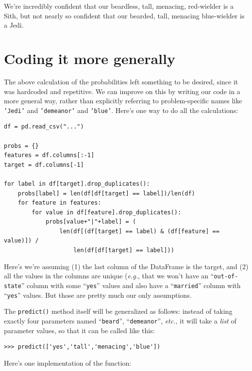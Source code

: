We're incredibly confident that our beardless, tall, menacing, red-wielder is
a Sith, but not nearly so confident that our bearded, tall, menacing
blue-wielder is a Jedi.

\vspace{.2in}
\section{Coding it more generally}

The above calculation of the probabilities left something to be desired, since
it was hardcoded and repetitive. We can improve on this by writing our code in
a more general way, rather than explicitly referring to problem-specific names
like \texttt{'Jedi'} and \texttt{'demeanor'} and \texttt{'blue'}. Here's one
way to do all the calculations:


\begin{Verbatim}[fontsize=\small,samepage=true,frame=single]
df = pd.read_csv("...")

probs = {}
features = df.columns[:-1]
target = df.columns[-1]

for label in df[target].drop_duplicates():
    probs[label] = len(df[df[target] == label])/len(df)
    for feature in features:
        for value in df[feature].drop_duplicates():
            probs[value+"|"+label] = (
                len(df[(df[target] == label) & (df[feature] == value)]) / 
                    len(df[df[target] == label]))
\end{Verbatim}

Here's we're assuming (1) the last column of the DataFrame is the target, and
(2) all the values in the columns are unique (\textit{e.g.}, that we won't
have an ``\texttt{out-of-state}'' column with some ``\texttt{yes}'' values and
also have a ``\texttt{married}'' column with ``\texttt{yes}'' values. But those
are pretty much our only assumptions.

The \texttt{predict()} method itself will be generalized as follows: instead
of taking exactly four parameters named ``\texttt{beard}'',
``\texttt{demeanor}'', \textit{etc.}, it will take a \textit{list} of
parameter values, so that it can be called like this:

\begin{Verbatim}[fontsize=\small,samepage=true,frame=single]
>>> predict(['yes','tall','menacing','blue'])
\end{Verbatim}

Here's one implementation of the function:

